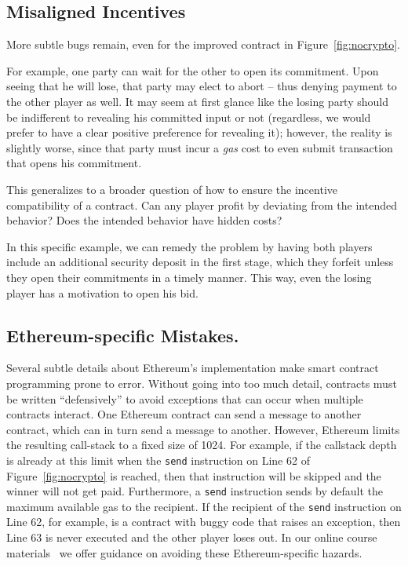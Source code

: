 \documentclass[10pt,twocolumn,letterpaper]{article}
\begin{document}
\subsection{Misaligned Incentives}
\label{sec:incentive}
More subtle bugs remain, even for the improved contract in Figure~\ref{fig:nocrypto}.

For example, one party can 
wait for the other to open its commitment. Upon
seeing that he will lose, that party may elect
to abort -- thus denying payment
to the other player as well. 
It may seem at first glance like the losing party should be indifferent to revealing his committed input or not (regardless, we would prefer to have a clear positive preference for revealing it); however, the reality is slightly worse, since that party must incur a \emph{gas} cost to even submit transaction that opens his commitment.

This generalizes to a broader question of how to 
ensure the incentive compatibility of a contract.
Can any player profit by deviating from the intended behavior?
Does the intended behavior have hidden costs?

In this specific example, we can remedy the problem
by having both players include an additional security deposit in the first stage,
which they forfeit unless they open their commitments in a timely manner.
This way, even the losing player has a motivation to open his bid.

\subsection{Ethereum-specific Mistakes.}
Several subtle details about Ethereum's implementation make smart contract programming prone to error. Without going into too much detail, contracts must be written ``defensively'' to avoid exceptions that can occur when multiple contracts interact. One Ethereum contract can send a message to another contract, which can in turn send a message to another. However, Ethereum limits the resulting call-stack to a fixed size of 1024. For example, if the callstack depth is already at this limit when the \texttt{send} instruction on Line 62 of Figure~\ref{fig:nocrypto} is reached, then that instruction will be skipped and the winner will not get paid. Furthermore, a \texttt{send} instruction sends by default the maximum available gas to the recipient. If the recipient of the \texttt{send} instruction on Line 62, for example, is a contract with buggy code that raises an exception, then Line 63 is never executed and the other player loses out. In our online course materials~\cite{anonymous} we offer guidance on avoiding these Ethereum-specific hazards.
\end{document}
